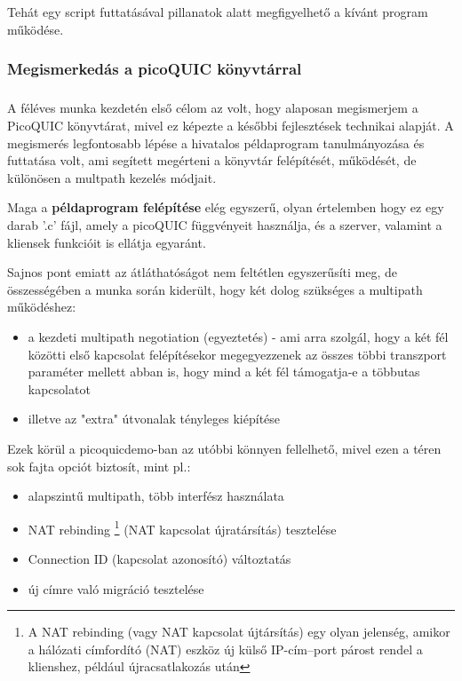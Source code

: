 \documentclass[a4paper,oneside]{article}
\begin{document}
Tehát egy script futtatásával pillanatok alatt megfigyelhető a kívánt program működése.

\subsubsection{Megismerkedás a picoQUIC könyvtárral}

\subparagraph{}
A féléves munka kezdetén első célom az volt, 
hogy alaposan megismerjem a PicoQUIC könyvtárat, mivel ez képezte a későbbi 
fejlesztések technikai alapját. A megismerés legfontosabb lépése a hivatalos példaprogram
tanulmányozása és futtatása volt, ami segített megérteni a könyvtár felépítését, 
működését, de különösen a multpath kezelés módjait.

Maga a \textbf{példaprogram felépítése} elég egyszerű, olyan értelemben hogy ez egy darab '.c' fájl, amely a picoQUIC függvényeit használja, 
és a szerver, valamint a kliensek funkcióit is ellátja egyaránt. 

Sajnos pont emiatt az átláthatóságot nem feltétlen egyszerűsíti meg, de összességében 
a munka során kiderült, hogy két dolog szükséges a multipath működéshez:

\begin{itemize}

  \item a kezdeti multipath negotiation (egyeztetés) - ami arra szolgál, hogy a két fél közötti első
  kapcsolat felépítésekor megegyezzenek az összes többi transzport paraméter mellett abban is, 
  hogy mind a két fél támogatja-e a többutas kapcsolatot

  \item illetve az "extra" útvonalak tényleges kiépítése

\end{itemize}

Ezek körül a picoquicdemo-ban az utóbbi könnyen fellelhető, mivel ezen a téren sok fajta opciót biztosít, mint pl.:
\begin{itemize}
  \item alapszintű multipath, több interfész használata
  \item NAT rebinding \footnote{A NAT rebinding (vagy NAT kapcsolat újtársítás) egy olyan jelenség, 
  amikor a hálózati címfordító (NAT) eszköz új külső IP-cím–port párost rendel a klienshez, 
  például újracsatlakozás után} (NAT kapcsolat újratársítás) tesztelése
  \item Connection ID (kapcsolat azonosító) változtatás 
  \item új címre való migráció tesztelése
\end{itemize}
\end{document}
